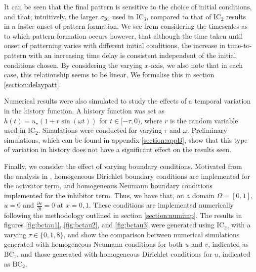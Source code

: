 It can be seen that the final pattern is sensitive to the choice of initial conditions, and that, intuitively, the larger $\sigma_{\text{IC}}$ used in $\text{IC}_3$, compared to that of $\text{IC}_2$ results in a faster onset of pattern formation. We see from considering the timescales as to which pattern formation occurs however, that although the time taken until onset of patterning varies with different initial conditions, the increase in time-to-pattern with an increasing time delay is consistent independent of the initial conditions chosen. By considering the varying $x$-axis, we also note that in each case, this relationship seems to be linear. We formalise this in section \ref{section:delaypatt}.

Numerical results were also simulated to study the effects of a temporal variation in the history function. A history function was set as $h(t)=u_\star(1+r\sin(\omega t))$ for $t\in[-\tau,0)$, where $r$ is the random variable used in $\text{IC}_2$. Simulations were conducted for varying $\tau$ and $\omega$. Preliminary simulations, which can be found in appendix \ref{section:appB}, show that this type of variation in history does not have a significant effect on the results seen.

Finally, we consider the effect of varying boundary conditions. Motivated from the analysis in \cite{krausemixed}, homogeneous Dirichlet boundary conditions are implemented for the activator term, and homogeneous Neumann boundary conditions implemented for the inhibitor term. Thus, we have that, on a domain $\Omega=[0,1]$, $u=0$ and $\frac{\partial v}{\partial t}=0$ at $x=0, 1$. These conditions are implemented numerically following the methodology outlined in section \ref{section:numimp}. The results in figures \ref{fig:bctau1}, \ref{fig:bctau2}, and \ref{fig:bctau3} were generated using $\text{IC}_2$, with a varying $\tau\in\{0,1,8\}$, and show the comparison between numerical simulations generated with homogeneous Neumann conditions for both $u$ and $v$, indicated as $\text{BC}_1$, and those generated with homogeneous Dirichlet conditions for $u$, indicated as $\text{BC}_2$.

